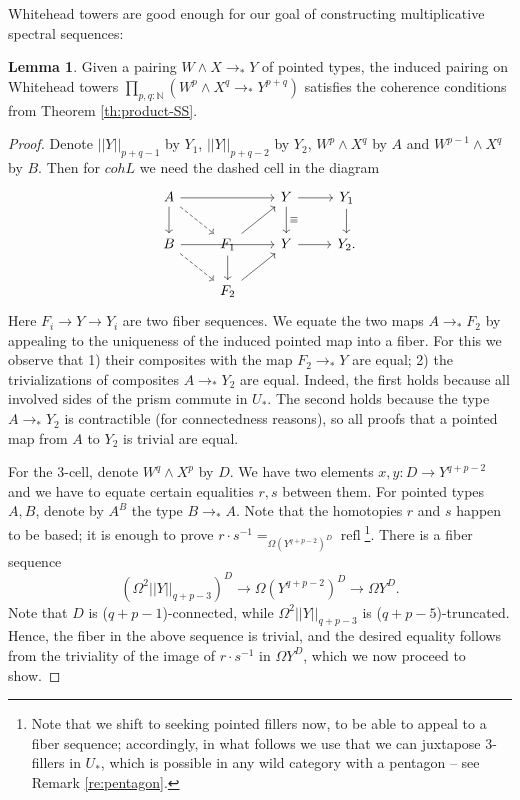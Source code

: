 \documentclass{amsart}
\theoremstyle{definition}
\newtheorem{lem}[theorem]{Lemma}
\newcommand{\refl}{\operatorname{refl}}
\newcommand{\depfun}[2]{\prod\limits_{#1}^{}{#2}}
\newcommand{\pto}{\to_*}
\begin{document}
Whitehead towers are good enough for our goal of constructing multiplicative spectral sequences:
\begin{lem}\label{le:Whitehead-coh}
    Given a pairing $W \wedge X \pto Y$ of pointed types,
    the induced pairing on Whitehead towers $\depfun{p,q: \mathbb{N}}{(W^{p} \wedge X^{q} \pto Y^{p+q})}$
    satisfies the coherence conditions from Theorem \ref{th:product-SS}.
\end{lem}
\begin{proof}
    Denote $||Y||_{p+q-1}$ by $Y_1$, $||Y||_{p+q-2 }$ by $Y_2$, $W^{p} \wedge X^q$ by $A$ and $W^{p-1} \wedge X^{q}$ by $B$. Then for $cohL$ we need the dashed cell in the diagram
    \[\begin{tikzcd}
    	A && Y & {Y_1} \\
    	B & {F_1} & Y & {Y_2.} \\
    	& {F_2}
    	\arrow[from=1-1, to=1-3]
    	\arrow[from=1-1, to=2-1]
    	\arrow[dashed, from=1-1, to=2-2]
    	\arrow[from=1-3, to=1-4]
    	\arrow["\equiv", from=1-3, to=2-3]
    	\arrow[from=1-4, to=2-4]
    	\arrow[from=2-1, to=2-3]
    	\arrow[dashed, from=2-1, to=3-2]
    	\arrow[from=2-2, to=1-3]
    	\arrow[from=2-2, to=3-2]
    	\arrow[from=2-3, to=2-4]
    	\arrow[from=3-2, to=2-3]
    \end{tikzcd}\]
    Here $F_i \to Y \to Y_i$ are two fiber sequences. We equate the two maps $A \pto F_2$ by appealing to the uniqueness of the induced pointed map into a fiber. For this we observe that 1) their composites with the map $F_2 \pto Y$ are equal; 2) the trivializations of composites $A \pto Y_2$ are equal. Indeed, the first holds because all involved sides of the prism commute in $U_*$. The second holds because the type $A \pto Y_2$ is contractible (for connectedness reasons), so all proofs that a pointed map from $A$ to $Y_2$ is trivial are equal.

    For the 3-cell, denote $W^q \wedge X^p$ by $D$. We have two elements $x,y: D \to Y^{q+p-2}$ and we have to equate certain equalities $r,s$ between them. For pointed types $A, B$, denote by $A^B$ the type $B \pto A$. Note that the homotopies $r$ and $s$ happen to be based; it is enough to prove $r \cdot s^{-1} =_{\Omega (Y^{q+p-2})^{D} } \refl $\footnote{Note that we shift to seeking pointed fillers now, to be able to appeal to a fiber sequence; accordingly, in what follows we use that we can juxtapose 3-fillers in $U_*$, which is possible in any wild category with a pentagon -- see Remark \ref{re:pentagon}.}. There is a fiber sequence
    $$(\Omega^2 ||Y||_{q+p-3})^D \to \Omega (Y^{q+p-2})^{D} \to \Omega Y^D.$$
    Note that $D$ is ($q+p-1$)-connected, while $\Omega^2 ||Y||_{q+p-3}$ is ($q+p-5$)-truncated. Hence, the fiber in the above sequence is trivial, and the desired equality follows from the triviality of the image of $r \cdot s^{-1}$ in $\Omega Y^D$, which we now proceed to show.


\end{proof}
\end{document}
